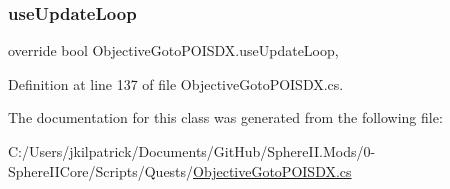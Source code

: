 \subsubsection{\texorpdfstring{useUpdateLoop}{useUpdateLoop}}
{\footnotesize\ttfamily override bool Objective\+Goto\+P\+O\+I\+S\+D\+X.\+use\+Update\+Loop\hspace{0.3cm}{\ttfamily [get]}, {\ttfamily [protected]}}



Definition at line 137 of file Objective\+Goto\+P\+O\+I\+S\+D\+X.\+cs.



The documentation for this class was generated from the following file\+:\begin{DoxyCompactItemize}
\item 
C\+:/\+Users/jkilpatrick/\+Documents/\+Git\+Hub/\+Sphere\+I\+I.\+Mods/0-\/\+Sphere\+I\+I\+Core/\+Scripts/\+Quests/\mbox{\hyperlink{_objective_goto_p_o_i_s_d_x_8cs}{Objective\+Goto\+P\+O\+I\+S\+D\+X.\+cs}}\end{DoxyCompactItemize}
